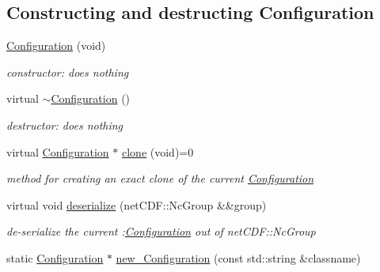 \subsection*{Constructing and destructing Configuration}
\begin{DoxyCompactItemize}
\item 
\mbox{\label{class_s_m_spp__di__unipi__it_1_1_configuration_ae6117b0effa7f2bb09f7bc6a88414831}} 
\mbox{\hyperlink{class_s_m_spp__di__unipi__it_1_1_configuration_ae6117b0effa7f2bb09f7bc6a88414831}{Configuration}} (void)
\begin{DoxyCompactList}\small\item\em constructor\+: does nothing \end{DoxyCompactList}\item 
\mbox{\label{class_s_m_spp__di__unipi__it_1_1_configuration_a080b7d97e47cd9bba370205c7c481ca2}} 
virtual \mbox{\hyperlink{class_s_m_spp__di__unipi__it_1_1_configuration_a080b7d97e47cd9bba370205c7c481ca2}{$\sim$\+Configuration}} ()
\begin{DoxyCompactList}\small\item\em destructor\+: does nothing \end{DoxyCompactList}\item 
virtual \mbox{\hyperlink{class_s_m_spp__di__unipi__it_1_1_configuration}{Configuration}} $\ast$ \mbox{\hyperlink{class_s_m_spp__di__unipi__it_1_1_configuration_aa982da3f095d1a857dc95d53ac335700}{clone}} (void)=0
\begin{DoxyCompactList}\small\item\em method for creating an exact clone of the current \mbox{\hyperlink{class_s_m_spp__di__unipi__it_1_1_configuration}{Configuration}} \end{DoxyCompactList}\item 
virtual void \mbox{\hyperlink{class_s_m_spp__di__unipi__it_1_1_configuration_af03cd244e01fc59411ed4fcd6bd92949}{deserialize}} (net\+C\+D\+F\+::\+Nc\+Group \&\&group)
\begin{DoxyCompactList}\small\item\em de-\/serialize the current \+:\mbox{\hyperlink{class_s_m_spp__di__unipi__it_1_1_configuration}{Configuration}} out of net\+C\+D\+F\+::\+Nc\+Group \end{DoxyCompactList}\item 
static \mbox{\hyperlink{class_s_m_spp__di__unipi__it_1_1_configuration}{Configuration}} $\ast$ \mbox{\hyperlink{class_s_m_spp__di__unipi__it_1_1_configuration_af321a3adfc7fcd3e0f9d21b03bdb3fae}{new\+\_\+\+Configuration}} (const std\+::string \&classname)

\end{DoxyCompactItemize}
